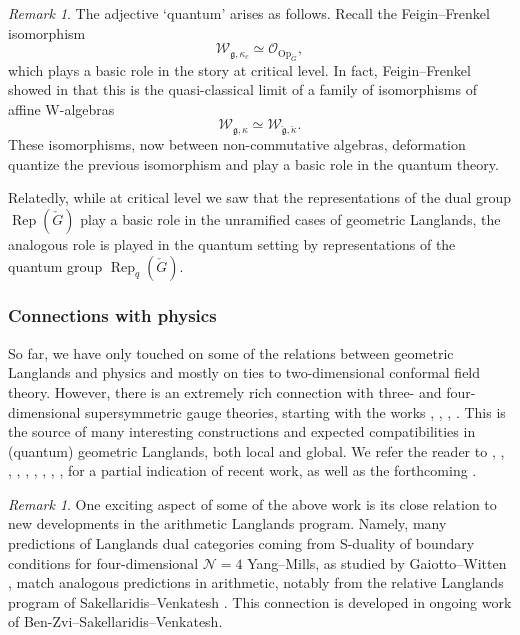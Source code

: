 \documentclass[10pt]{amsart}
\newcommand{\Op}{\mathrm{Op}_{\cG}}
\newcommand{\fg}{\mathfrak{g}}
\newcommand{\on}{\operatorname}
\theoremstyle{remark}
\newtheorem{re}[subsubsection]{Remark}
\newcommand{\OO}{\mathscr{O}}
\numberwithin{equation}{section}
\newcommand{\cfg}{\check{\fg}}
\newcommand{\cG}{\check{G}}
\begin{document}
    
    \begin{re} The adjective `quantum' arises as follows. Recall the 
    Feigin--Frenkel isomorphism 
    \[      \mathscr{W}_{\fg, \kappa_c} \simeq \OO_{\Op},
    \]
    which plays a basic role in the story at critical level. In fact, 
    Feigin--Frenkel 
    showed in \cite{feiginfrenkel91} that
    this is the quasi-classical limit of a family of isomorphisms of affine 
    W-algebras
    \[   \mathscr{W}_{\fg, \kappa} \simeq \mathscr{W}_{\cfg, \check{\kappa}}. \]
    These isomorphisms, now between non-commutative algebras, 
    deformation quantize the previous isomorphism and play a basic role in the 
    quantum theory. 
    
    Relatedly, while at critical level we saw that  the representations of the 
    dual group $\on{Rep}(\cG)$ play a basic role in 
    the unramified cases of geometric Langlands, the analogous role is played 
    in the quantum setting by representations of the quantum group 
    $\on{Rep}_q(\cG)$.  
    \end{re}
    
    
   \subsubsection{Connections with physics} So far, we have only touched on 
   some of the relations between geometric Langlands and physics and mostly on ties to two-dimensional 
   conformal field theory. However, there is an extremely rich connection with three- and four-dimensional supersymmetric gauge theories, starting with the works \cite{kapustinwitten}, \cite{wittenwild}, \cite{gukovwitten}, \cite{frenkelwitten}. This is the 
   source of many interesting constructions and expected compatibilities in 
   (quantum) geometric Langlands, both local and global. We refer the reader to \cite{gaiotto16s-duality}, \cite{gaiottorapcak}, \cite{bfn}, \cite{gaiottotwistcompact}, \cite{costellogaiotto}, \cite{creutziggaiotto}, \cite{creutziggaiottolinshaw}, \cite{frenkelgaiotto}, \cite{bfgt}, \cite{hilburnraskin} for a partial 
   indication of recent work, as well as the forthcoming \cite{gaiottoyu}.  
   
  
 
 \begin{re} 
   One exciting aspect of some of the above work is its close relation to new developments in the arithmetic Langlands program. Namely, many predictions of Langlands dual categories coming from
    S-duality of boundary conditions for four-dimensional  
   $\mathscr{N} = 4$ Yang--Mills, as studied by Gaiotto--Witten \cite{gaiottowitten}, match analogous predictions in arithmetic, notably from the relative Langlands program of Sakellaridis--Venkatesh \cite{sakellaridisvenkatesh}. This connection is 
   developed in ongoing work of Ben-Zvi--Sakellaridis--Venkatesh. 
\end{re}
\end{document}
